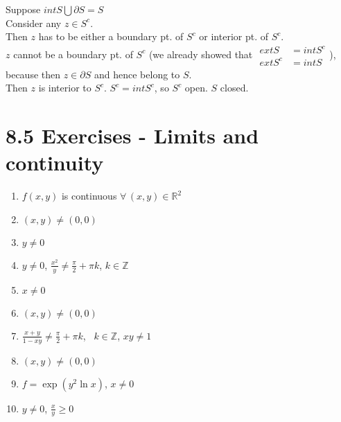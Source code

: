 \documentclass[twoside]{amsart}
\theoremstyle{plain}
\theoremstyle{definition}
\newcommand{\exercisehead}[1]
  {
   \noindent{\small\bf Exercise #1.}
   \smallskip}
\begin{document}
Suppose $int{S} \bigcup \partial S =S$ \\
\quad Consider any $z \in S^c$.  \\
Then $z$ has to be either a boundary pt. of $S^c$ or interior pt. of $S^c$.  \\
\quad $z$ cannot be a boundary pt. of $S^c$ (we already showed that $\begin{aligned} ext{S} & = int{S^c} \\ ext{S^c} & = int{S} \end{aligned}$), because then $z\in \partial S$ and hence belong to $S$.  \\
Then $z$ is interior to $S^c$.  $S^c = int{S^c}$, so $S^c$ open.  $S$ closed.  


\section*{ 8.5 Exercises - Limits and continuity }

\exercisehead{1} 
\begin{enumerate}
  \item $f(x,y)$ is continuous $\forall \, (x,y) \in \mathbb{R}^2$ 
  \item $(x,y) \neq (0,0)$
  \item $y\neq 0$
\item $y\neq 0$, $\frac{x^2}{y} \neq \frac{\pi}{2} + \pi k$, $k \in \mathbb{Z}$
\item $x\neq 0$
\item $(x,y) \neq (0,0)$
\item $\frac{x+y}{1 - xy} \neq \frac{\pi}{2} + \pi k$, \, $k\in \mathbb{Z}$, $xy\neq 1$
\item $(x,y) \neq (0,0)$
\item $f = \exp{(y^2 \ln{x}) }$, $x\neq 0$
\item $ y \neq 0$, $\frac{x}{y} \geq 0$
\end{enumerate}
\end{document}
